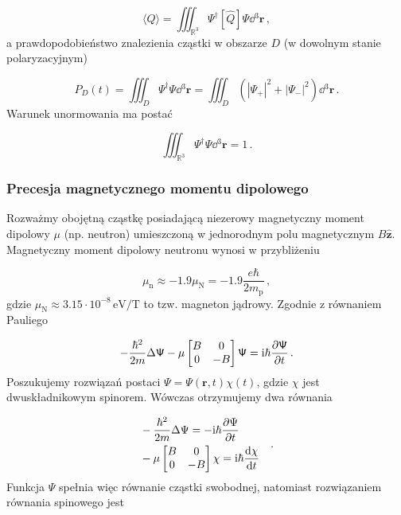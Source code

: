 \documentclass{myclass}
\begin{document}
\begin{equation*}
\langle Q\rangle=\iiint_{\mathbb{R}^3}\mathsf{\Psi}^\dag[\hat{Q}]\mathsf{\Psi}\dd{^3\mathbf{r}}\,,
\end{equation*}
a prawdopodobieństwo znalezienia cząstki w obszarze \(D\) (w dowolnym stanie polaryzacyjnym)

\begin{equation*}
P_D(t)=\iiint_{D}\mathsf{\Psi}^\dag\mathsf{\Psi}\dd{^3\mathbf{r}}=\iiint_{D}\left(|\Psi_+|^2+|\Psi_-|^2\right)\dd{^3\mathbf{r}}\,.
\end{equation*}
Warunek unormowania ma postać

\begin{equation*}
\iiint_{\mathbb{R}^3}\mathsf{\Psi}^\dag\mathsf{\Psi}\dd{^3\mathbf{r}}=1\,.
\end{equation*}

\subsubsection{Precesja magnetycznego momentu dipolowego}

Rozważmy obojętną cząstkę posiadającą niezerowy magnetyczny moment dipolowy \(\mu\) (np. neutron)
umieszczoną w jednorodnym polu magnetycznym \(B\mathbf{\hat{z}}\). Magnetyczny moment dipolowy
neutronu wynosi w przybliżeniu

\begin{equation*}
\mu_\text{n}\approx -1.9\mu_\text{N}=-1.9\frac{e\hbar}{2m_\text{p}}\,,
\end{equation*}
gdzie \(\mu_\text{N}\approx3.15\cdot10^{-8}\,\text{eV/T}\) to tzw. magneton jądrowy. Zgodnie z
równaniem Pauliego

\begin{equation*}
-\frac{\hbar^2}{2m}\Delta\mathsf{\Psi}-\mu\begin{bmatrix}
B & 0\\
0 & -B
\end{bmatrix}\mathsf{\Psi}=\mathrm{i}\hbar\pdv{\mathsf{\Psi}}{t}\,.
\end{equation*}
Poszukujemy rozwiązań postaci \(\mathsf{\Psi}=\Psi(\mathbf{r},t)\chi(t)\), gdzie \(\chi\) jest
dwuskładnikowym spinorem. Wówczas otrzymujemy dwa równania

\begin{equation*}
\begin{split}
&-\frac{\hbar^2}{2m}\Delta\Psi=-\mathrm{i}\hbar\pdv{\Psi}{t}\\
&-\mu\begin{bmatrix}
B & 0\\
0 & -B
\end{bmatrix}\chi=\mathrm{i}\hbar\dv{\chi}{t}
\end{split}\quad.
\end{equation*}
Funkcja \(\Psi\) spełnia więc równanie cząstki swobodnej, natomiast rozwiązaniem równania spinowego
jest
\end{document}
